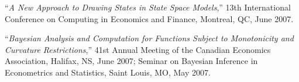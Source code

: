 \documentclass[12pt]{article}
\begin{document}
``{\it A New Approach to Drawing States in State Space Models},''
13th International Conference on Computing in Economics and Finance,
Montreal, QC,
June 2007.

``{\it Bayesian Analysis and Computation for Functions Subject to Monotonicity and Curvature Restrictions},''
41st Annual Meeting of the Canadian Economics Association,
Halifax, NS,
June 2007;
Seminar on Bayesian Inference in Econometrics and Statistics,
Saint Louis, MO,
May 2007.







\end{document}
